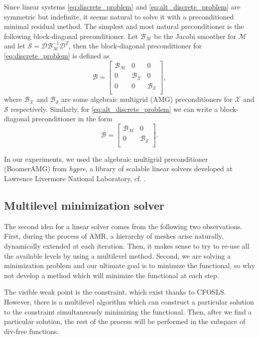 \documentclass[a4paper,12pt]{amsart}
\numberwithin{equation}{section}
\newcommand{\B}{{\mathcal B}}
\newcommand{\D}{{\mathcal D}}
\newcommand{\M}{{\mathcal M}}
\newcommand{\X}{{\mathcal X}}
\newcommand{\calS}{{\mathcal S}}
\begin{document}
Since linear systems \eqref{eq:discrete_problem} and \eqref{eq:alt_discrete_problem} are symmetric but indefinite, it seems natural to solve it with a preconditioned minimal residual method. The simplest and most natural preconditioner is the following block-diagonal preconditioner. Let $\B_\M$ be the Jacobi smoother for $\M$ and let $\calS = \D\B_\M^{-1}\D^T$, then the block-diagonal preconditioner for \eqref{eq:discrete_problem} is defined as
\begin{equation*}
\B = \begin{bmatrix}
\B_\M & 0 & 0 \\
0 & \B_\X & 0 \\
0 & 0 & \B_\calS \\
\end{bmatrix},
\end{equation*}
where $\B_\X$ and $\B_\calS$ are some algebraic multigrid (AMG) preconditioners for $\X$ and $\calS$ respectively. Similarly, for \eqref{eq:alt_discrete_problem} we can write a block-diagonal preconditioner in the form
\begin{equation*}
\B = \begin{bmatrix}
\B_\M & 0 \\
0 & \B_\calS \\
\end{bmatrix}.
\end{equation*}

In our experiments, we used the algebraic multigrid preconditioner (BoomerAMG) from \emph{hypre}, a library of scalable linear solvers developed at Lawrence Livermore National Laboratory, cf. \cite{boomerAMG, hypre}.

\subsection{Multilevel minimization solver}

The second idea for a linear solver comes from the following two observations. First, during the process of AMR, a hierarchy of meshes arise naturally, dynamically extended at each iteration. Then, it makes sense to try to re-use all the available levels by using a multilevel method. Second, we are solving a minimization problem and our ultimate goal is to minimize the functional, so why not develop a method which will minimize the functional at each step.

The visible weak point is the constraint, which exist thanks to CFOSLS. However, there is a multilevel algorithm which can construct a particular solution to the constraint simultaneously minimizing the functional. Then, after we find a particular solution, the rest of the process will be performed in the subspace of div-free functions.
\end{document}
